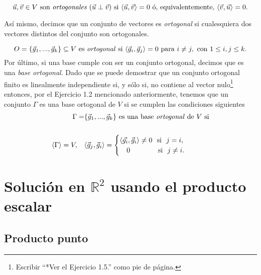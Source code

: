 \documentclass[12pt,dvipsnames]{article}
\numberwithin{equation}{section}
\begin{document}
\[
    \vec{u},\vec{v}\in V \ \text{son \emph{ortogonales}} \ (\vec{u}\perp\vec{v}) \ \text{si} \ \langle \vec{u} , \vec{v} \rangle = 0 \ \text{ó, equivalentemente,} \ \langle \vec{v} , \vec{u} \rangle = 0.
\] 

\noindent Así mismo, decimos que un conjunto de vectores es \emph{ortogonal} si cualesquiera dos vectores distintos del conjunto son ortogonales.

\[
    O=\{\vec{g}_1,...,\vec{g}_k\}\subseteq V \ \text{es \emph{ortogonal} si} \ \langle \vec{g}_i , \vec{g}_j \rangle = 0 \ \text{para} \ i\neq j, \ \text{con} \ 1\le i,j\le k.
\]
\noindent Por último, si una base cumple con ser un conjunto ortogonal, decimos que es una \emph{base ortogonal}. Dado que se puede demostrar que un conjunto ortogonal finito es linealmente independiente si, y sólo si, no contiene al vector nulo\footnote{Escribir ``*Ver el Ejercicio 1.5.'' como pie de página.} entonces, por el Ejercicio 1.2 mencionado anteriormente, tenemos que un conjunto $\Gamma$ es una base ortogonal de $V$ si se cumplen las condiciones siguientes
\begin{align*}
    \Gamma=&\{\vec{g}_1,...,\vec{g}_k\} \text{ es una base \emph{ortogonal} de } V \text{ si}\\
    \\
\langle\Gamma\rangle = V, \quad &\langle \vec{g}_j , \vec{g}_i \rangle = \begin{cases} \langle\vec{g_i}, \vec{g}_i\rangle\neq0 \ \ \text{si} \ \ j = i, \\ \quad 0 \quad \ \ \ \ \ \ \ \ \ \text{si} \ \ j\neq i. \end{cases}\\
\end{align*}


\section{Solución en $\mathbb{R}^2$ usando el producto escalar}

\subsection{Producto punto}
\end{document}
